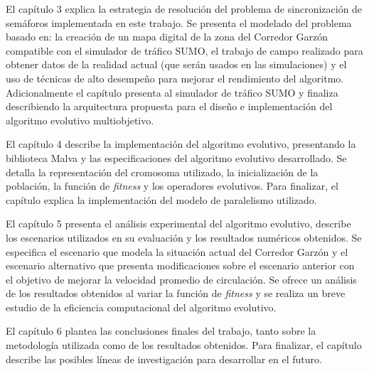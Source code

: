 El capítulo 3 explica la estrategia de resolución del problema de sincronización de semáforos implementada en este trabajo. Se presenta el modelado del problema basado en: la creación de un mapa digital de la zona del Corredor Garzón compatible con el simulador de tráfico SUMO, el trabajo de campo realizado para obtener datos de la realidad actual (que serán usados en las simulaciones) y el uso de técnicas de alto desempeño para mejorar el rendimiento del algoritmo. Adicionalmente el capítulo presenta al simulador de tráfico SUMO y finaliza describiendo la arquitectura propuesta para el diseño e implementación del algoritmo evolutivo multiobjetivo.

El capítulo 4 describe la implementación del algoritmo evolutivo, presentando la biblioteca Malva y las especificaciones del algoritmo evolutivo desarrollado. Se detalla la representación del cromosoma utilizado, la inicialización de la población, la función de \emph{fitness} y los operadores evolutivos. Para finalizar, el capítulo explica la implementación del modelo de paralelismo utilizado.

El capítulo 5 presenta el análisis experimental del algoritmo evolutivo, describe los escenarios utilizados en su evaluación y los resultados numéricos obtenidos. Se especifica el escenario que modela la situación actual del Corredor Garzón y el escenario alternativo que presenta modificaciones sobre el escenario anterior con el objetivo de mejorar la velocidad promedio de circulación. Se ofrece un análisis de los resultados obtenidos al variar la función de \emph{fitness} y se realiza un breve estudio de la eficiencia computacional del algoritmo evolutivo.

El capítulo 6 plantea las conclusiones finales del trabajo, tanto sobre la metodología utilizada como de los resultados obtenidos. Para finalizar, el capítulo describe las posibles líneas de investigación para desarrollar en el futuro.






